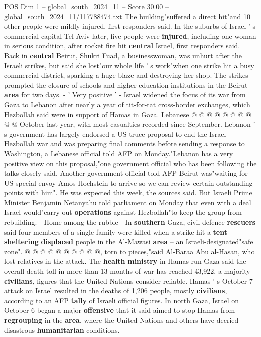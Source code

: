 \begin{textsample}{POS Dim 1 – global\_south\_2024\_11 – Score 30.00 – global\_south\_2024\_11/117788474.txt}
The building"suffered a direct hit"and 10 other people were mildly injured, first responders said.
In the suburbs of Israel ' s commercial capital Tel Aviv later, five people were \textbf{injured}, including one woman in serious condition, after rocket fire hit \textbf{central} Israel, first responders said.
Back in \textbf{central} Beirut, Shukri Fuad, a businesswoman, was unhurt after the Israeli strikes, but said she lost"our whole life ' s work"when one strike hit a busy commercial district, sparking a huge blaze and destroying her shop.
The strikes prompted the closure of schools and higher education institutions in the Beirut \textbf{area} for two days. - ' Very positive ' - Israel widened the focus of its war from Gaza to Lebanon after nearly a year of tit-for-tat cross-border exchanges, which Hezbollah said were in support of Hamas in Gaza.
Lebanese @ @ @ @ @ @ @ @ @ @ October last year, with most casualties recorded since September.
Lebanon ' s government has largely endorsed a US truce proposal to end the Israel-Hezbollah war and was preparing final comments before sending a response to Washington, a Lebanese official told AFP on Monday."Lebanon has a very positive view on this proposal,"one government official who has been following the talks closely said.
Another government official told AFP Beirut was"waiting for US special envoy Amos Hochstein to arrive so we can review certain outstanding points with him".
He was expected this week, the sources said.
But Israeli Prime Minister Benjamin Netanyahu told parliament on Monday that even with a deal Israel would"carry out \textbf{operations} against Hezbollah"to keep the group from rebuilding. - Home among the rubble - In \textbf{southern} Gaza, civil defence \textbf{rescuers} said four members of a single family were killed when a strike hit a \textbf{tent} \textbf{sheltering} \textbf{displaced} people in the Al-Mawasi \textbf{area} -- an Israeli-designated"safe zone". @ @ @ @ @ @ @ @ @ @, torn to pieces,"said Al-Baraa Abu al-Hasan, who lost relatives in the attack.
The \textbf{health} \textbf{ministry} in Hamas-run Gaza said the overall death toll in more than 13 months of war has reached 43,922, a majority \textbf{civilians}, figures that the United Nations consider reliable.
Hamas ' s October 7 attack on Israel resulted in the deaths of 1,206 people, mostly \textbf{civilians}, according to an AFP \textbf{tally} of Israeli official figures.
In north Gaza, Israel on October 6 began a major \textbf{offensive} that it said aimed to stop Hamas from \textbf{regrouping} in the \textbf{area}, where the United Nations and others have decried disastrous \textbf{humanitarian} conditions.

\end{textsample}
